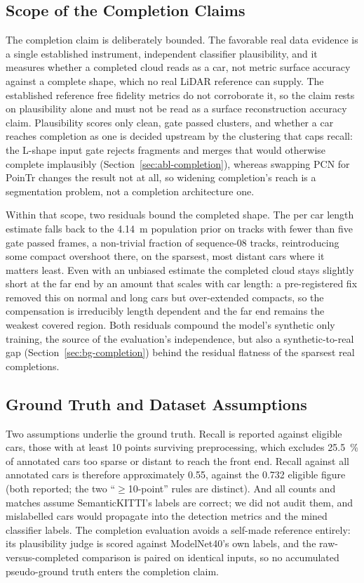 \documentclass[a4paper,12pt]{report}
\begin{document}
\subsection{Scope of the Completion Claims}
\label{sec:disc-completion-scope}

The completion claim is deliberately bounded. The favorable real data evidence is a single
established instrument, independent classifier plausibility, and it measures whether a
completed cloud reads as a car, not metric surface accuracy against a complete shape, which
no real LiDAR reference can supply. The established reference free fidelity metrics do not
corroborate it, so the claim rests on plausibility alone and must not be read as a
surface reconstruction accuracy claim. Plausibility scores only clean, gate passed clusters,
and whether a car reaches completion as one is decided upstream by the clustering that caps
recall: the L-shape input gate rejects fragments and merges that would otherwise complete
implausibly (Section~\ref{sec:abl-completion}), whereas swapping PCN for PoinTr changes the
result not at all, so widening completion's reach is a segmentation problem, not a
completion architecture one.

Within that scope, two residuals bound the completed shape. The per car length estimate falls
back to the \SI{4.14}{\metre} population prior on tracks with fewer than five gate passed
frames, a non-trivial fraction of sequence-08 tracks, reintroducing some compact
overshoot there, on the sparsest, most distant cars where it matters least. Even with an
unbiased estimate the completed cloud stays slightly short at the far end by an amount that
scales with car length: a pre-registered fix removed this on normal and long cars but
over-extended compacts, so the compensation is irreducibly length dependent and the far end
remains the weakest covered region. Both residuals compound the model's synthetic only
training, the source of the evaluation's independence, but also a synthetic-to-real gap
(Section~\ref{sec:bg-completion}) behind the residual flatness of the sparsest real
completions.

\subsection{Ground Truth and Dataset Assumptions}
\label{sec:disc-gt}

Two assumptions underlie the ground truth. Recall is reported against eligible cars, those
with at least \num{10} points surviving preprocessing, which excludes \SI{25.5}{\percent}
of annotated cars too sparse or distant to reach the front end. Recall against all
annotated cars is therefore approximately \num{0.55}, against the \num{0.732} eligible figure (both
reported; the two ``$\geq$10-point'' rules are distinct). And all counts and matches assume
SemanticKITTI's labels are correct; we did not audit them, and mislabelled cars would
propagate into the detection metrics and the mined classifier labels. The completion
evaluation avoids a self-made reference entirely: its plausibility judge is scored against
ModelNet40's own labels, and the raw-versus-completed comparison is paired on identical
inputs, so no accumulated pseudo-ground truth enters the completion claim.
\end{document}
